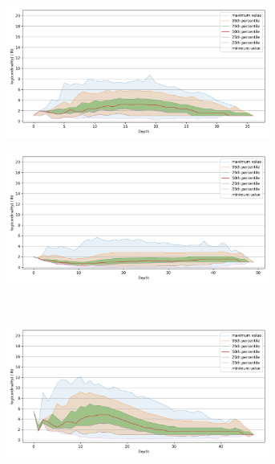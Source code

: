 \begin{figure}
    \begin{subfigure}[b]{0.47\textwidth}
    \includegraphics[width=0.95\textwidth]{images/lfd_plots/fashion-mnist-60000-lfd.png}\\
    \label{fig:results:fashion-mnist-lfd}
    \end{subfigure}%
    \begin{subfigure}[b]{0.47\textwidth}
    \includegraphics[width=0.95\textwidth]{images/lfd_plots/glove-25-1183514-lfd.png}\\
    \label{fig:results:glove-25-lfd}
    \end{subfigure}
    \vspace{1em}
    \\
    \begin{subfigure}[b]{0.47\textwidth}
    \includegraphics[width=0.95\textwidth]{images/lfd_plots/sift-1000000-lfd.png}\\

\end{subfigure}
\end{figure}
